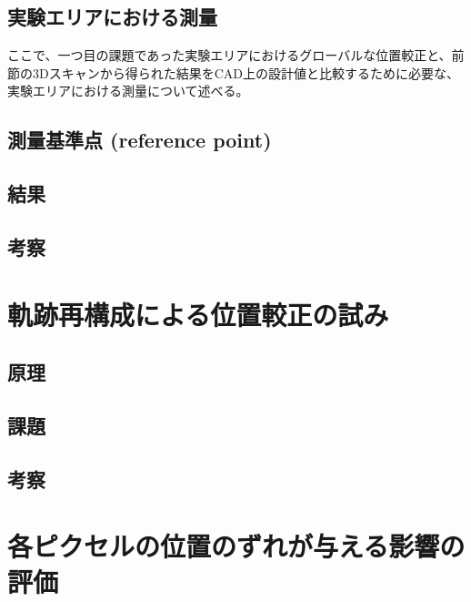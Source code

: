 \documentclass[Yonemoto_master.tex]{subfiles}
\begin{document}
\subsection{実験エリアにおける測量}
ここで、一つ目の課題であった実験エリアにおけるグローバルな位置較正と、前節の3Dスキャンから得られた結果をCAD上の設計値と比較するために必要な、実験エリアにおける測量について述べる。
\subsection{測量基準点 (reference point)}
\subsection{結果}
\subsection{考察}

\section{軌跡再構成による位置較正の試み}
\subsection{原理}
\subsection{課題}
\subsection{考察}

\section{各ピクセルの位置のずれが与える影響の評価}
\end{document}
